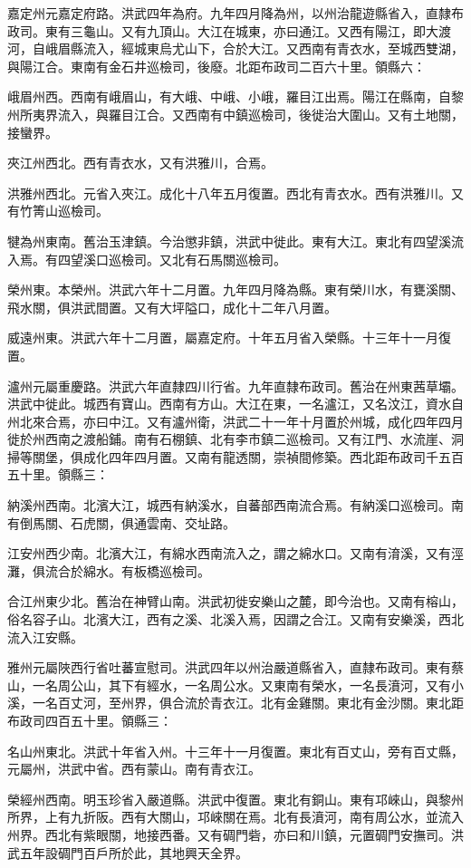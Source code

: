 嘉定州元嘉定府路。洪武四年為府。九年四月降為州，以州治龍遊縣省入，直隸布政司。東有三龜山。又有九頂山。大江在城東，亦曰通江。又西有陽江，即大渡河，自峨眉縣流入，經城東烏尤山下，合於大江。又西南有青衣水，至城西雙湖，與陽江合。東南有金石井巡檢司，後廢。北距布政司二百六十里。領縣六：

峨眉州西。西南有峨眉山，有大峨、中峨、小峨，羅目江出焉。陽江在縣南，自黎州所夷界流入，與羅目江合。又西南有中鎮巡檢司，後徙治大圍山。又有土地關，接蠻界。

夾江州西北。西有青衣水，又有洪雅川，合焉。

洪雅州西北。元省入夾江。成化十八年五月復置。西北有青衣水。西有洪雅川。又有竹箐山巡檢司。

犍為州東南。舊治玉津鎮。今治懲非鎮，洪武中徙此。東有大江。東北有四望溪流入焉。有四望溪口巡檢司。又北有石馬關巡檢司。

榮州東。本榮州。洪武六年十二月置。九年四月降為縣。東有榮川水，有甕溪關、飛水關，俱洪武間置。又有大坪隘口，成化十二年八月置。

威遠州東。洪武六年十二月置，屬嘉定府。十年五月省入榮縣。十三年十一月復置。

瀘州元屬重慶路。洪武六年直隸四川行省。九年直隸布政司。舊治在州東茜草壩。洪武中徙此。城西有寶山。西南有方山。大江在東，一名瀘江，又名汶江，資水自州北來合焉，亦曰中江。又有瀘州衛，洪武二十一年十月置於州城，成化四年四月徙於州西南之渡船鋪。南有石棚鎮、北有李市鎮二巡檢司。又有江門、水流崖、洞掃等關堡，俱成化四年四月置。又南有龍透關，崇禎間修築。西北距布政司千五百五十里。領縣三：

納溪州西南。北濱大江，城西有納溪水，自蕃部西南流合焉。有納溪口巡檢司。南有倒馬關、石虎關，俱通雲南、交址路。

江安州西少南。北濱大江，有綿水西南流入之，謂之綿水口。又南有淯溪，又有涇灘，俱流合於綿水。有板橋巡檢司。

合江州東少北。舊治在神臂山南。洪武初徙安樂山之麓，即今治也。又南有榕山，俗名容子山。北濱大江，西有之溪、北溪入焉，因謂之合江。又南有安樂溪，西北流入江安縣。

雅州元屬陜西行省吐蕃宣慰司。洪武四年以州治嚴道縣省入，直隸布政司。東有蔡山，一名周公山，其下有經水，一名周公水。又東南有榮水，一名長濆河，又有小溪，一名百丈河，至州界，俱合流於青衣江。北有金雞關。東北有金沙關。東北距布政司四百五十里。領縣三：

名山州東北。洪武十年省入州。十三年十一月復置。東北有百丈山，旁有百丈縣，元屬州，洪武中省。西有蒙山。南有青衣江。

榮經州西南。明玉珍省入嚴道縣。洪武中復置。東北有銅山。東有邛崍山，與黎州所界，上有九折阪。西有大關山，邛崍關在焉。北有長濆河，南有周公水，並流入州界。西北有紫眼關，地接西番。又有碉門砦，亦曰和川鎮，元置碉門安撫司。洪武五年設碉門百戶所於此，其地興天全界。

